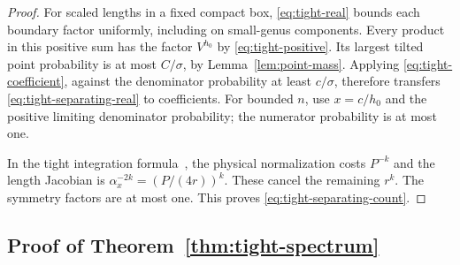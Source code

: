 \begin{proof}
For scaled lengths in a fixed compact box,
\eqref{eq:tight-real} bounds each boundary factor uniformly, including
on small-genus components. Every product in this positive sum has
the factor $V^{h_0}$ by \eqref{eq:tight-positive}. Its largest tilted
point probability is at most $C/\sigma$, by Lemma~\ref{lem:point-mass}. Applying \eqref{eq:tight-coefficient}, against the
denominator probability at least $c/\sigma$, therefore transfers
\eqref{eq:tight-separating-real} to coefficients. For bounded $n$,
use $x=c/h_0$ and the positive limiting denominator probability;
the numerator probability is at most one.

In the tight integration formula~\cite[Proposition~3.2]{BL}, the
physical normalization costs $P^{-k}$ and the length Jacobian is
$\alpha_x^{-2k}=(P/(4r))^k$. These cancel the remaining $r^k$.
The symmetry factors are at most one. This proves
\eqref{eq:tight-separating-count}.
\end{proof}

\subsection{Proof of Theorem~\ref{thm:tight-spectrum}}\label{subsec:tight-proof}

